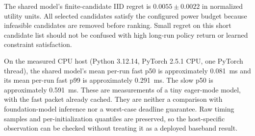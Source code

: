 The shared model's finite-candidate IID regret is
$0.0055\pm0.0022$ in normalized utility units. All selected candidates satisfy
the configured power budget because infeasible candidates are removed before
ranking. Small regret on this short candidate list should not be confused with
high long-run policy return or learned constraint satisfaction.

On the measured CPU host (Python 3.12.14, PyTorch 2.5.1 CPU, one PyTorch thread),
the shared model's mean per-run fast p50 is approximately 0.081~ms and its mean
per-run fast p99 is approximately 0.291~ms. The slow p50 is approximately
0.591~ms. These are measurements of a tiny eager-mode model, with the fast
packet already cached. They are neither a comparison with foundation-model
inference nor a worst-case deadline guarantee. Raw timing samples and
per-initialization quantiles are preserved, so the host-specific observation
can be checked without treating it as a deployed baseband result.
